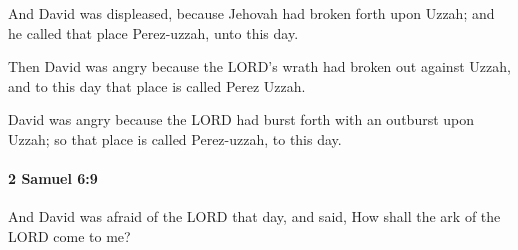 			\begin{versebox}
					\item[BHS] 
					\item[ASV] And David was displeased, because Jehovah had broken forth upon Uzzah; and he called that place Perez-uzzah, unto this day.
					\item[NIV] Then David was angry because the LORD’s wrath had broken out against Uzzah, and to this day that place is called Perez Uzzah.
					\item[NRSV] David was angry because the LORD had burst forth with an outburst upon Uzzah; so that place is called Perez-uzzah, to this day.
			\end{versebox}

		\paragraph{2 Samuel 6:9} %
			\label{2SAMUEL-6-9}

			And David was afraid of the LORD that day, and said, How shall the ark of the LORD come to me?


